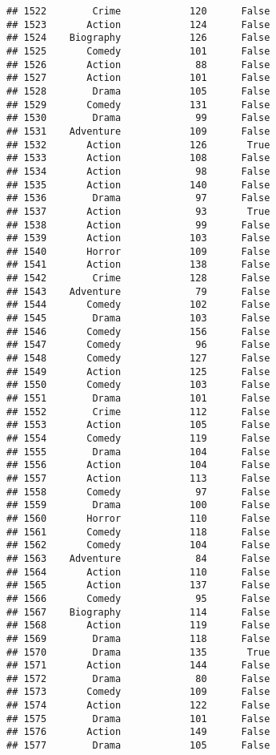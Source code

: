 \documentclass[
]{article}
\begin{document}
\begin{verbatim}
## 1522        Crime            120      False
## 1523       Action            124      False
## 1524    Biography            126      False
## 1525       Comedy            101      False
## 1526       Action             88      False
## 1527       Action            101      False
## 1528        Drama            105      False
## 1529       Comedy            131      False
## 1530        Drama             99      False
## 1531    Adventure            109      False
## 1532       Action            126       True
## 1533       Action            108      False
## 1534       Action             98      False
## 1535       Action            140      False
## 1536        Drama             97      False
## 1537       Action             93       True
## 1538       Action             99      False
## 1539       Action            103      False
## 1540       Horror            109      False
## 1541       Action            138      False
## 1542        Crime            128      False
## 1543    Adventure             79      False
## 1544       Comedy            102      False
## 1545        Drama            103      False
## 1546       Comedy            156      False
## 1547       Comedy             96      False
## 1548       Comedy            127      False
## 1549       Action            125      False
## 1550       Comedy            103      False
## 1551        Drama            101      False
## 1552        Crime            112      False
## 1553       Action            105      False
## 1554       Comedy            119      False
## 1555        Drama            104      False
## 1556       Action            104      False
## 1557       Action            113      False
## 1558       Comedy             97      False
## 1559        Drama            100      False
## 1560       Horror            110      False
## 1561       Comedy            118      False
## 1562       Comedy            104      False
## 1563    Adventure             84      False
## 1564       Action            110      False
## 1565       Action            137      False
## 1566       Comedy             95      False
## 1567    Biography            114      False
## 1568       Action            119      False
## 1569        Drama            118      False
## 1570        Drama            135       True
## 1571       Action            144      False
## 1572        Drama             80      False
## 1573       Comedy            109      False
## 1574       Action            122      False
## 1575        Drama            101      False
## 1576       Action            149      False
## 1577        Drama            105      False

\end{verbatim}
\end{document}
